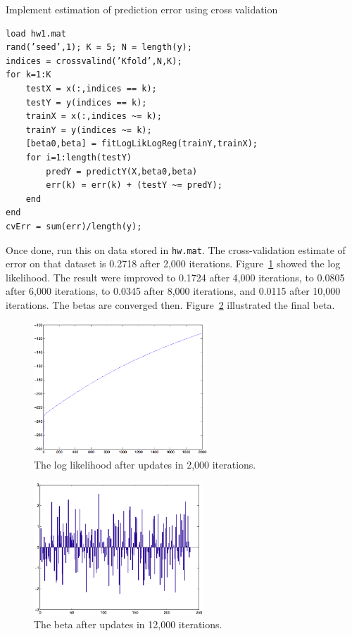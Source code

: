 \documentclass{article}
\begin{document}
\newproblem{1pt}
Implement estimation of prediction error using cross validation
\begin{verbatim}
load hw1.mat
rand(’seed’,1); K = 5; N = length(y);
indices = crossvalind(’Kfold’,N,K);
for k=1:K
    testX = x(:,indices == k);
    testY = y(indices == k);
    trainX = x(:,indices ~= k);
    trainY = y(indices ~= k);
    [beta0,beta] = fitLogLikLogReg(trainY,trainX);
    for i=1:length(testY)
        predY = predictY(X,beta0,beta)
        err(k) = err(k) + (testY ~= predY);
    end
end
cvErr = sum(err)/length(y);
\end{verbatim}
Once done, run this on data stored in \texttt{hw\theHW.mat}. The cross-validation estimate of error on that dataset is 0.2718 after 2,000 iterations. Figure~\ref{fig:log2000} showed the log likelihood. The result were improved to 0.1724 after 4,000 iterations, to 0.0805 after 6,000 iterations, to 0.0345 after 8,000 iterations, and 0.0115 after 10,000 iterations. The betas are converged then. Figure~\ref{fig:beta12000} illustrated the final beta.

\begin{figure}[T]
\begin{center}
\includegraphics[height=50mm]{loglikeli2000.png}
\caption{The log likelihood after updates in 2,000 iterations.}
\label{fig:log2000}
\end{center}
\end{figure}

\begin{figure}[T]
\begin{center}
\includegraphics[height=50mm]{beta12000.png}
\caption{The beta after updates in 12,000 iterations.}
\label{fig:beta12000}
\end{center}
\end{figure}
\end{document}
